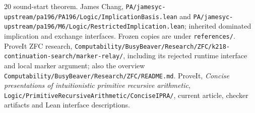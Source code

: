 \documentclass[11pt,letterpaper]{article}
\newcommand{\file}[1]{\texttt{\nolinkurl{#1}}}
\begin{document}
\begin{thebibliography}{20}
sound-start theorem.
 James Chang, \file{PA/jamesyc-upstream/pa196/PA196/Logic/ImplicationBasis.lean} and
\file{PA/jamesyc-upstream/pa196/M6/Logic/RestrictedImplication.lean}; inherited dominated
implication and exchange interfaces. Frozen copies are under
\file{references/}.
 ProveIt ZFC research,
\file{Computability/BusyBeaver/Research/ZFC/k218-continuation-search/marker-relay/},
including its rejected runtime interface and local marker argument;
also the overview \file{Computability/BusyBeaver/Research/ZFC/README.md}.
 ProveIt, \emph{Concise presentations of intuitionistic primitive
recursive arithmetic}, \file{Logic/PrimitiveRecursiveArithmetic/ConciseIPRA/},
current article, checker artifacts and Lean interface descriptions.
\end{thebibliography}
\end{document}
